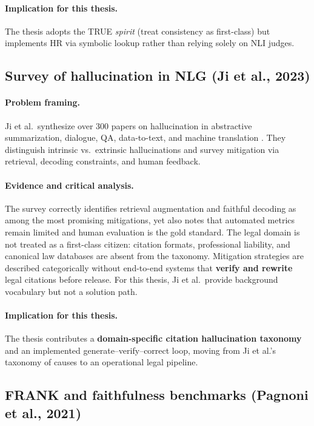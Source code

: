 \paragraph{Implication for this thesis.}
The thesis adopts the TRUE \emph{spirit} (treat consistency as first-class) but implements HR via symbolic lookup rather than relying solely on NLI judges.

\subsection{Survey of hallucination in NLG (Ji et al., 2023)}
\label{sec:lit-ji-survey}

\paragraph{Problem framing.}
Ji et al.\ synthesize over 300 papers on hallucination in abstractive summarization, dialogue, QA, data-to-text, and machine translation \cite{ji2023hallucinationsurvey}. They distinguish intrinsic vs.\ extrinsic hallucinations and survey mitigation via retrieval, decoding constraints, and human feedback.

\paragraph{Evidence and critical analysis.}
The survey correctly identifies retrieval augmentation and faithful decoding as among the most promising mitigations, yet also notes that automated metrics remain limited and human evaluation is the gold standard. The legal domain is not treated as a first-class citizen: citation formats, professional liability, and canonical law databases are absent from the taxonomy. Mitigation strategies are described categorically without end-to-end systems that \textbf{verify and rewrite} legal citations before release. For this thesis, Ji et al.\ provide background vocabulary but not a solution path.

\paragraph{Implication for this thesis.}
The thesis contributes a \textbf{domain-specific citation hallucination taxonomy} and an implemented generate--verify--correct loop, moving from Ji et al.'s taxonomy of causes to an operational legal pipeline.

\subsection{FRANK and faithfulness benchmarks (Pagnoni et al., 2021)}

